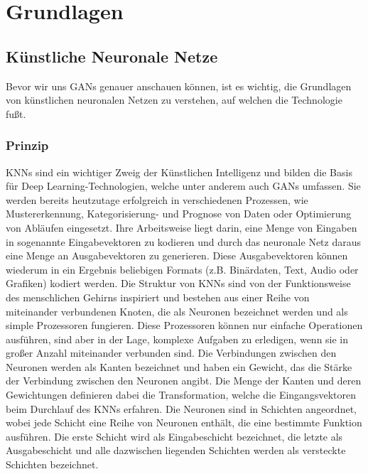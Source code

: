 \chapter{Grundlagen}

\section{Künstliche Neuronale Netze}

\noindent Bevor wir uns \acp{GAN} genauer anschauen können, ist es wichtig, die Grundlagen von künstlichen neuronalen Netzen zu verstehen, auf welchen die Technologie fußt.

\subsection{Prinzip}

\noindent \acp{KNN} sind ein wichtiger Zweig der Künstlichen Intelligenz und bilden die Basis für Deep Learning-Technologien, welche unter anderem auch GANs umfassen. Sie werden bereits heutzutage erfolgreich in verschiedenen Prozessen, wie Mustererkennung, Kategorisierung- und Prognose von Daten oder Optimierung von Abläufen eingesetzt. Ihre Arbeitsweise liegt darin, eine Menge von Eingaben in sogenannte Eingabevektoren zu kodieren und durch das neuronale Netz daraus eine Menge an Ausgabevektoren zu generieren. Diese Ausgabevektoren können wiederum in ein Ergebnis beliebigen Formats (z.B. Binärdaten, Text, Audio oder Grafiken) kodiert werden. Die Struktur von \acp{KNN} sind von der Funktionsweise des menschlichen Gehirns inspiriert und bestehen aus einer Reihe von miteinander verbundenen Knoten, die als Neuronen bezeichnet werden und als simple Prozessoren fungieren. Diese Prozessoren können nur einfache Operationen ausführen, sind aber in der Lage, komplexe Aufgaben zu erledigen, wenn sie in großer Anzahl miteinander verbunden sind. Die Verbindungen zwischen den Neuronen werden als Kanten bezeichnet und haben ein Gewicht, das die Stärke der Verbindung zwischen den Neuronen angibt. Die Menge der Kanten und deren Gewichtungen definieren dabei die Transformation, welche die Eingangsvektoren beim Durchlauf des \ac{KNN}s erfahren. Die Neuronen sind in Schichten angeordnet, wobei jede Schicht eine Reihe von Neuronen enthält, die eine bestimmte Funktion ausführen. Die erste Schicht wird als Eingabeschicht bezeichnet, die letzte als Ausgabeschicht und alle dazwischen liegenden Schichten werden als versteckte Schichten bezeichnet.\cite{knnbook}\\

